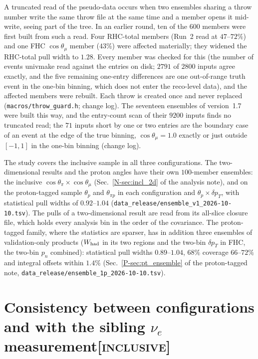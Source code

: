 \documentclass[11pt,a4paper]{article}
\newcommand{\ptref}[2]{#1~\ref{P-#2} of the proton-tagged note}
\newcommand{\noteref}[2]{#1~\ref{N-#2} of the analysis note}
\newcommand{\scopetag}[1]{\hfill{\normalfont\small\textsc{[#1]}}}
\begin{document}
A truncated read of the pseudo-data occurs when two ensembles sharing a throw number write the
same throw file at the same time and a member opens it mid-write, seeing part of the tree. In an earlier round, ten of the $600$ members were first built from such a
read. Four RHC-total members (Run~2 read at $47$--$72\%$) and one FHC
$\cos\theta_\mu$ member ($43\%$) were affected materially; they widened the RHC-total pull width
to $1.28$. Every member was checked for this (the number of events univmake read against the entries on disk;
$2791$ of $2800$ inputs agree exactly, and the five remaining one-entry differences are one
out-of-range truth event in the one-bin binning, which does not enter the reco-level data), and
the affected members were rebuilt. Each throw is created once and never replaced
(\texttt{macros/throw\_guard.h}; change log). The seventeen ensembles of version~1.7 were built this way, and the entry-count scan of their $9200$
inputs finds no truncated read; the $71$ inputs short by one or two entries are the boundary case of an
event at the edge of the true binning, $\cos\theta_\mu=1.0$ exactly or just outside $[-1,1]$ in the one-bin
binning (change log).

The study covers the inclusive sample in all three configurations. The two-dimensional results and
the proton angles have their own $100$-member ensembles: the inclusive
$\cos\theta_\pi\times\cos\theta_\mu$ (\noteref{Sec.}{sec:incl_2d}), and on the proton-tagged sample
$\theta_p$ and $\theta_{\pi p}$ in each configuration and $\theta_p\times\delta p_T$, with statistical
pull widths of $0.92$--$1.04$ (\texttt{data\_release/ensemble\_v1\_2026-10-10.tsv}). The pulls of a
two-dimensional result are read from its all-slice closure file, which holds every analysis bin in the
order of the covariance. The proton-tagged family, where the statistics are sparser, has in addition
three ensembles of validation-only products ($W_{\rm had}$ in its two regions and the two-bin
$\delta p_T$ in FHC, the two-bin $p_n$ combined): statistical pull widths $0.89$--$1.04$, $68\%$
coverage $66$--$72\%$ and integral offsets within $1.4\%$ (\ptref{Sec.}{sec:pt_ensemble},
\texttt{data\_release/ensemble\_1p\_2026-10-10.tsv}).




\section[Consistency between configurations and with the sibling $\nu_e$ measurement]{Consistency between configurations and with the sibling $\nu_e$ measurement\scopetag{inclusive}}
\label{sec:supp_closure}
\end{document}
